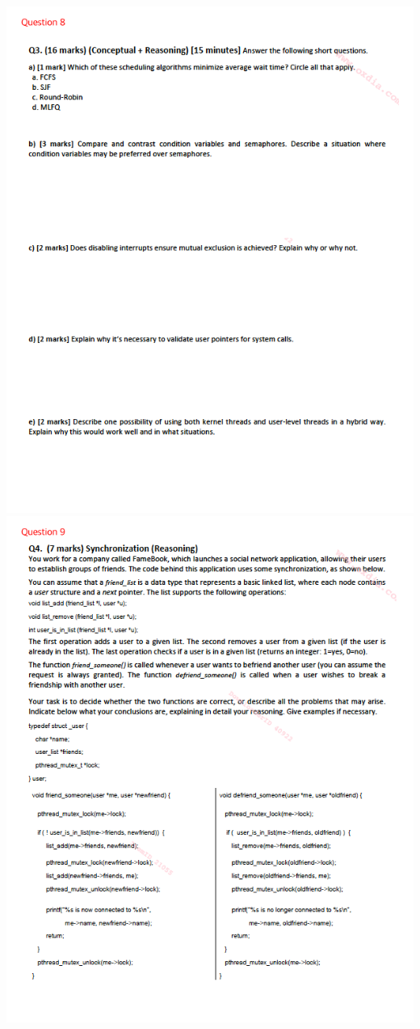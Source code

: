 \documentclass[12pt]{article}
\begin{document}
\begin{center}
    \includegraphics[width=\linewidth]{../../images/midterm_5_8.png}
    \includegraphics[width=\linewidth]{../../images/midterm_5_9.png}

\end{center}
\end{document}
